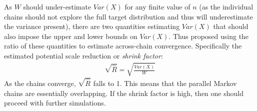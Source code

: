 \documentclass[14pt]{extarticle} %
\begin{document}
	As $W$ should under-estimate $Var(X)$ for any finite value of $n$ (as the individual chains should not explore the full target distribution and thus will underestimate the variance present), there are two quantities estimating $Var(X)$ that should also impose the upper and lower bounds on $Var(X)$. Thus \citet{GelmanInferenceIterativeSimulation1992} proposed using the ratio of these quantities to estimate across-chain convergence. Specifically the estimated potential scale reduction or \emph{shrink factor}:
	\begin{align}
	\sqrt{\hat{R}} = \sqrt{\frac{\hat{Var}(X)}{W}}
	\end{align}
	As the chains converge, $\sqrt{\hat{R}}$ falls to 1. This means that the parallel Markov chains  are  essentially  overlapping.   If  the  shrink  factor  is  high,  then  one  should  proceed  with further simulations.
	


%	
	
	
\end{document}
